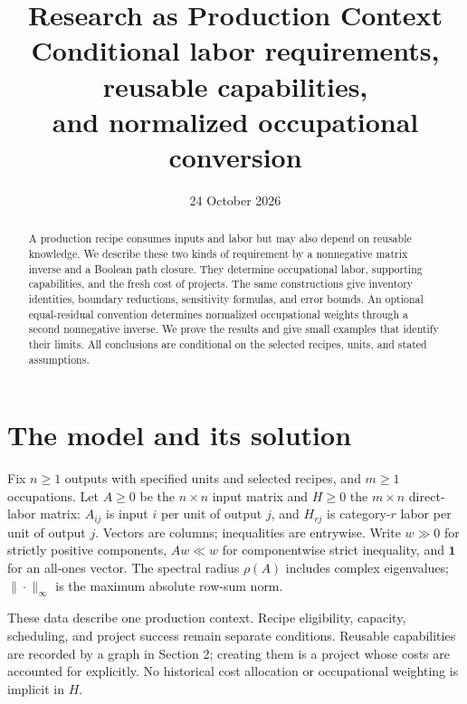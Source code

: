 \documentclass[11pt,a4paper]{article}
\title{Research as Production Context\\[4pt]\large Conditional labor requirements, reusable capabilities,\\and normalized occupational conversion}
\author{}
\date{24 October 2026}
\begin{document}
\maketitle
\begin{abstract}
A production recipe consumes inputs and labor but may also depend on reusable knowledge. We describe these two kinds of requirement by a nonnegative matrix inverse and a Boolean path closure. They determine occupational labor, supporting capabilities, and the fresh cost of projects. The same constructions give inventory identities, boundary reductions, sensitivity formulas, and error bounds. An optional equal-residual convention determines normalized occupational weights through a second nonnegative inverse. We prove the results and give small examples that identify their limits. All conclusions are conditional on the selected recipes, units, and stated assumptions.
\end{abstract}

\section{The model and its solution}
Fix $n\geq1$ outputs with specified units and selected recipes, and $m\geq1$ occupations. Let $A\geq0$ be the $n\times n$ input matrix and $H\geq0$ the $m\times n$ direct-labor matrix: $A_{ij}$ is input $i$ per unit of output $j$, and $H_{rj}$ is category-$r$ labor per unit of output $j$. Vectors are columns; inequalities are entrywise. Write $w\gg0$ for strictly positive components, $Aw\ll w$ for componentwise strict inequality, and $\mathbf1$ for an all-ones vector. The spectral radius $\rho(A)$ includes complex eigenvalues; $\|\cdot\|_\infty$ is the maximum absolute row-sum norm.

These data describe one production context. Recipe eligibility, capacity, scheduling, and project success remain separate conditions. Reusable capabilities are recorded by a graph in Section 2; creating them is a project whose costs are accounted for explicitly. No historical cost allocation or occupational weighting is implicit in $H$.
\end{document}
